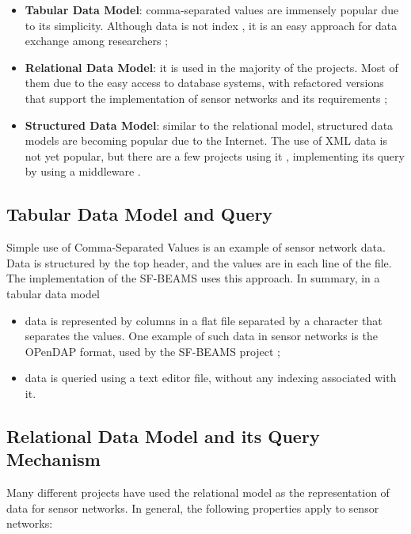 \begin{itemize}
  \item \textbf{Tabular Data Model}: comma-separated values are immensely
  popular due to its simplicity. Although data is not index , it is an easy
  approach for data exchange among researchers \cite{sn-provenance};
  \item \textbf{Relational Data Model}: it is used in the majority of the
  projects. Most of them due to the easy access to database systems, with
  refactored versions that support the implementation of sensor networks and
  its requirements \cite{sn-db-tinydb};
  \item \textbf{Structured Data Model}: similar to the relational model,
  structured data models are becoming popular due to the Internet. The use of
  XML data \cite{xml} is not yet popular, but there are a few projects using
  it \cite{sn-xml-usage01}\cite{sn-xml-usage02}, implementing its query by
  using a middleware \cite{sn-xml-middleware, sn-xml-query-engines}.
\end{itemize}

\subsection{Tabular Data Model and Query}

Simple use of Comma-Separated Values is an example of sensor network data. Data
is structured by the top header, and the values are in each line of the file.
The implementation of the SF-BEAMS \cite{sfbeams2006} uses this approach. In
summary, in a tabular data model 

\begin{itemize}
  \item data is represented by columns in a flat file separated by a character
  that separates the values. One example of such data in sensor networks is the
  OPenDAP \cite{opendap} format, used by the SF-BEAMS project
  \cite{sfbeams2006};
  \item data is queried using a text editor file, without any indexing
  associated with it.
\end{itemize}

\subsection{Relational Data Model and its Query Mechanism}

Many different projects have used the relational model \cite{relational-model}
as the representation of data for sensor networks. In general, the following
properties apply to sensor networks:

